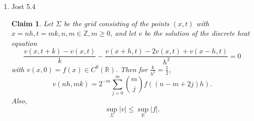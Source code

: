 \documentclass[a4paper]{article}
\newtheorem*{claim}{Claim}
\newcommand{\R}{\mathbb{R}}
\newcommand{\Z}{\mathbb{Z}}
\begin{document}
\begin{enumerate}
\begin{proof}
    Because we assumed $u_t - Lu < 0$, we must have $u_t(x_0, t_0) < 0$. But $u_t(x_0,t_0) = 0$ at an interior minimum. Therefore $x \in
    \partial \Omega_{T-\varepsilon}$.

    If $(x_0, t_0) \in \Omega \times \{T-\varepsilon\}$, then as above, we would get $Lu(x_0,t_0) \leq 0$, so $u_t(x_0, t_0) < 0$, reaching the same
    contradiction as before.
    Therefore, we must have $(x_0,t_0) \in \partial^\ast \Omega_{T-\varepsilon}$.

    Because $u$ is continuous, by taking $\varepsilon \to 0$, we get $(x_0, t_0) \in \partial^\ast \Omega_T$, as desired.

    For the general case, we assume
    \[ u_t - Lu \leq 0 .\]
    Define $v = u - \varepsilon t$ for some $\varepsilon >0$. We have
    \begin{align*}
      v_t &= u_t - \varepsilon \\
      \leq Lu - \varepsilon \\
      &= Lv - \varepsilon \\
      < Lv
    \end{align*}
    Therefore, we know $v_t - Lv < 0$. We can then apply the work above to get
    \begin{align*}
      \max_{ \overline{\Omega}_T } u &= \max_{ \overline{\Omega}_T } (v + \varepsilon t) \\
      &\leq \max_{ \overline{\Omega_T} } v + \varepsilon T \\
      &= \max_{\partial^\ast \Omega_T} v + \varepsilon T \\
      &\leq \max_{\partial^\ast \Omega_T} u + \varepsilon T
    \end{align*}

    By letting $\varepsilon \to 0$, we get
    \[ \max_{\overline{\Omega}_T } u = \max_{\partial^\ast \Omega_T} u .\]
    \textbf{NEED TO CONSIDER $T=\infty$}

  \end{proof}

  \item Jost 5.4
    \begin{claim}
      Let $\Sigma$ be the grid consisting of the points $(x,t)$ with $x = nh, t = mk, n,m \in \Z, m \geq 0$, and let $v$ be the solution of the
      discrete heat equation
      \begin{equation} \label{eq:discrete_heat}
        \frac{v(x,t+k) - v(x,t)}{k} - \frac{v(x+h,t) - 2v(x,t) + v(x-h,t)}{h^2} = 0
    \end{equation}
      with $v(x,0) = f(x) \in C^0(\R)$.
      Then for $\frac{k}{h^2} = \frac{1}{2}$,
      \[ v(nh, mk) = 2^{-m} \sum_{j=0}^m \binom{m}{j} f \left( (n - m + 2j)h \right) .\]
      Also,
      \[ \sup_{\Sigma} |v| \leq \sup_\R |f|. \]
    \end{claim}


\end{enumerate}
\end{document}
